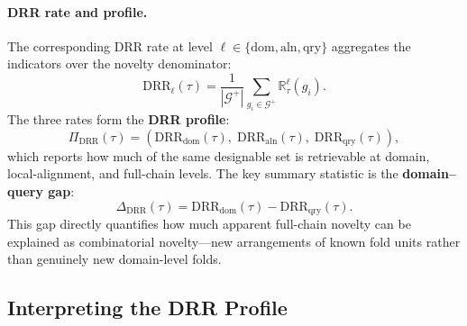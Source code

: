 \documentclass[letterpaper]{article} %
\begin{document}
\paragraph{DRR rate and profile.}
The corresponding DRR rate at level $\ell \in \{\mathrm{dom}, \mathrm{aln}, \mathrm{qry}\}$ aggregates the indicators over the novelty denominator:
\begin{equation}
\mathrm{DRR}_{\ell}(\tau) =
\frac{1}{|\mathcal{G}^{+}|}
\sum_{g_i \in \mathcal{G}^{+}}
\mathbb{R}^{\ell}_\tau(g_i).
\end{equation}
The three rates form the \textbf{DRR profile}:
\begin{equation}
\Pi_{\mathrm{DRR}}(\tau) =
\left(
\mathrm{DRR}_{\mathrm{dom}}(\tau),\;
\mathrm{DRR}_{\mathrm{aln}}(\tau),\;
\mathrm{DRR}_{\mathrm{qry}}(\tau)
\right),
\end{equation}
which reports how much of the same designable set is retrievable at domain, local-alignment, and full-chain levels. The key summary statistic is the \textbf{domain--query gap}:
\begin{equation}
\Delta_{\mathrm{DRR}}(\tau) = \mathrm{DRR}_{\mathrm{dom}}(\tau) - \mathrm{DRR}_{\mathrm{qry}}(\tau).
\end{equation}
This gap directly quantifies how much apparent full-chain novelty can be explained as combinatorial novelty---new arrangements of known fold units rather than genuinely new domain-level folds.

\subsection{Interpreting the DRR Profile}
\end{document}
